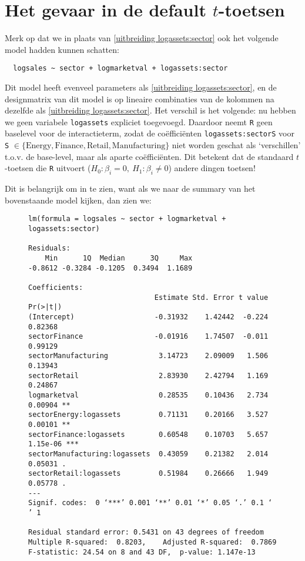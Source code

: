 \documentclass[a4paper]{report}
\begin{document}
\section{Het gevaar in de default $t$-toetsen}

  Merk op dat we in plaats van \ref{uitbreiding logassets:sector} ook het volgende model hadden kunnen schatten:
  
  \begin{verbatim}
  logsales ~ sector + logmarketval + logassets:sector
  \end{verbatim}
  
  Dit model heeft evenveel parameters als \ref{uitbreiding logassets:sector}, en de designmatrix van dit model is op lineaire combinaties van de kolommen na dezelfde als \ref{uitbreiding logassets:sector}. Het verschil is het volgende: nu hebben we geen variabele \verb!logassets! expliciet toegevoegd. Daardoor neemt \verb!R! geen baselevel voor de interactieterm, zodat de co\"effici\"enten \verb!logassets:sectorS! voor \verb!S! $\in \{ \text{Energy}, \text{Finance}, \text{Retail}, \text{Manufacturing} \}$ niet worden geschat als `verschillen' t.o.v. de base-level, maar als aparte co\"effici\"enten. Dit betekent dat de standaard $t$-toetsen die \verb!R! uitvoert ($H_0: \beta_i = 0, \ H_1: \beta_i \neq 0$) andere dingen toetsen!
  
  Dit is belangrijk om in te zien, want als we naar de summary van het bovenstaande model kijken, dan zien we:
  
  \begin{figure}[H]
  \begin{verbatim}
lm(formula = logsales ~ sector + logmarketval + logassets:sector)

Residuals:
    Min      1Q  Median      3Q     Max 
-0.8612 -0.3284 -0.1205  0.3494  1.1689 

Coefficients:
                              Estimate Std. Error t value Pr(>|t|)    
(Intercept)                   -0.31932    1.42442  -0.224  0.82368    
sectorFinance                 -0.01916    1.74507  -0.011  0.99129    
sectorManufacturing            3.14723    2.09009   1.506  0.13943    
sectorRetail                   2.83930    2.42794   1.169  0.24867    
logmarketval                   0.28535    0.10436   2.734  0.00904 ** 
sectorEnergy:logassets         0.71131    0.20166   3.527  0.00101 ** 
sectorFinance:logassets        0.60548    0.10703   5.657 1.15e-06 ***
sectorManufacturing:logassets  0.43059    0.21382   2.014  0.05031 .  
sectorRetail:logassets         0.51984    0.26666   1.949  0.05778 .  
---
Signif. codes:  0 ‘***’ 0.001 ‘**’ 0.01 ‘*’ 0.05 ‘.’ 0.1 ‘ ’ 1

Residual standard error: 0.5431 on 43 degrees of freedom
Multiple R-squared:  0.8203,	Adjusted R-squared:  0.7869 
F-statistic: 24.54 on 8 and 43 DF,  p-value: 1.147e-13
  \end{verbatim}
  \end{figure}
\end{document}
